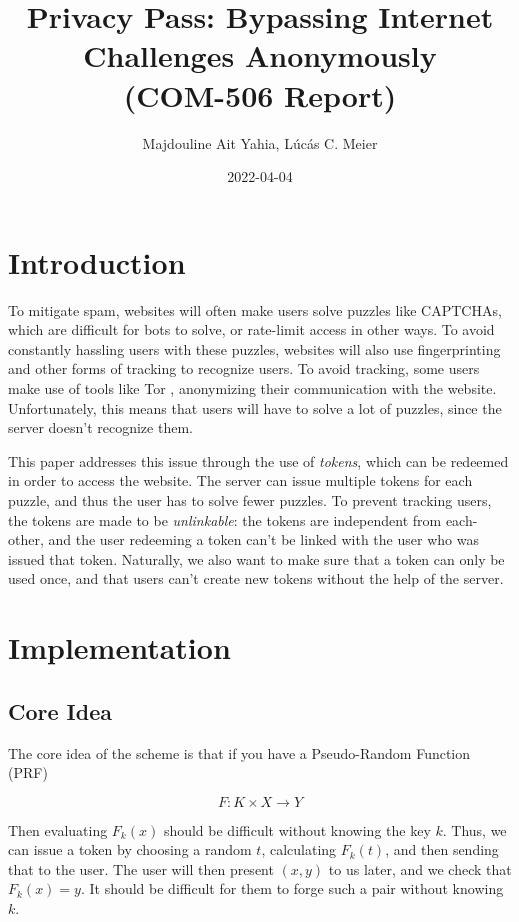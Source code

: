 \documentclass[9pt, a4paper]{article}
\date{2022-04-04}
\title{Privacy Pass: Bypassing Internet Challenges Anonymously\\
\large (COM-506 Report)
}
\author{Majdouline Ait Yahia, Lúcás C. Meier}
\begin{document}
\maketitle

\section{Introduction}

To mitigate spam, websites will often make users solve puzzles like CAPTCHAs,
which are difficult for bots to solve, or rate-limit access in other ways.
To avoid constantly hassling users with these puzzles, websites will
also use fingerprinting and other forms of tracking to recognize users.
To avoid tracking, some users make use of tools like Tor \cite{tor_2004},
anonymizing their communication with the website. Unfortunately,
this means that users will have to solve a lot of puzzles, since the
server doesn't recognize them.

This paper \cite{davidson_privacy_2018} addresses this issue through
the use of \emph{tokens}, which can be redeemed in order
to access the website.
The server can issue multiple tokens for each puzzle,
and thus the user has to solve fewer puzzles. To prevent tracking users,
the tokens are made to be \emph{unlinkable}: the tokens
are independent from each-other, and the user redeeming
a token can't be linked with the user who was issued that token.
Naturally, we also want to make sure that a token can only be used once,
and that users can't create new tokens without the help of the server.


\section{Implementation}

\subsection{Core Idea}

The core idea of the scheme is that if you have a Pseudo-Random Function (PRF)

$$
F : K \times X \to Y
$$

Then evaluating $F_k(x)$ should be difficult without knowing the key $k$. Thus,
we can issue a token by choosing a random $t$, calculating $F_k(t)$,
and then sending that to the user. The user will then present
$(x, y)$ to us later, and we check that $F_k(x) = y$. It should be difficult
for them to forge such a pair without knowing $k$.
\end{document}
